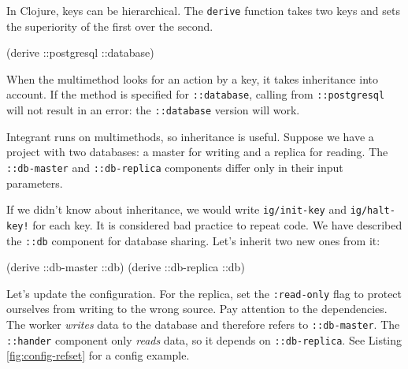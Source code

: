 
In Clojure, keys can be hierarchical. The \verb|derive| function takes two keys and sets the superiority of the first over the second.


\begin{english}
  \begin{clojure}
(derive ::postgresql ::database)
  \end{clojure}
\end{english}


When the multimethod looks for an action by a key, it takes inheritance into account. If the method is specified for \verb|::database|, calling from \verb|::postgresql| will not result in an error: the \verb|::database| version will work.

Integrant runs on multimethods, so inheritance is useful. Suppose we have a project with two databases: a master for writing and a replica for reading. The \verb|::db-master| and \verb|::db-replica| components differ only in their input parameters.

If we didn't know about inheritance, we would write \verb|ig/init-key| and \verb|ig/halt-key!| for each key. It is considered bad practice to repeat code. We have described the \verb|::db| component for database sharing. Let's inherit two new ones from it:

\begin{english}
  \begin{clojure}
(derive ::db-master ::db)
(derive ::db-replica ::db)
  \end{clojure}
\end{english}

Let's update the configuration. For the replica, set the \verb|:read-only| flag to protect ourselves from writing to the wrong source. Pay attention to the dependencies. The worker \emph{writes} data to the database and therefore refers to \verb|::db-master|. The \verb|::hander| component only \emph{reads} data, so it depends on \verb|::db-replica|. See Listing \ref{fig:config-refset} for a config example.

